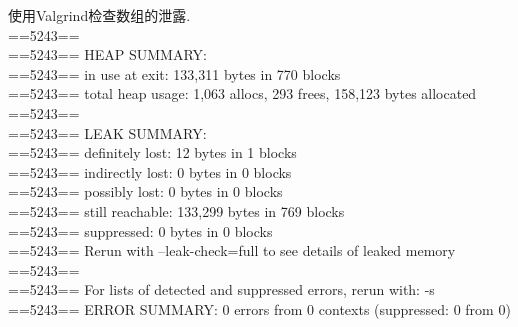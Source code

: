 \documentclass[a4paper]{article}
\begin{document}
使用Valgrind检查数组的泄露.\\
==5243== \\
==5243== HEAP SUMMARY: \\
==5243==     in use at exit: 133,311 bytes in 770 blocks \\
==5243==   total heap usage: 1,063 allocs, 293 frees, 158,123 bytes allocated \\
==5243== \\
==5243== LEAK SUMMARY: \\
==5243==    definitely lost: 12 bytes in 1 blocks \\
==5243==    indirectly lost: 0 bytes in 0 blocks \\
==5243==      possibly lost: 0 bytes in 0 blocks \\
==5243==    still reachable: 133,299 bytes in 769 blocks \\
==5243==         suppressed: 0 bytes in 0 blocks \\
==5243== Rerun with --leak-check=full to see details of leaked memory \\
==5243== \\
==5243== For lists of detected and suppressed errors, rerun with: -s \\
==5243== ERROR SUMMARY: 0 errors from 0 contexts (suppressed: 0 from 0) \\
    
\end{document}

